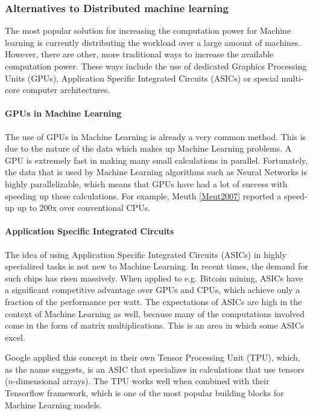 
\subsubsection{Alternatives to Distributed machine learning}
The most popular solution for increasing the computation power for Machine
learning is currently distributing the workload over a large amount of machines. However, there are other, more traditional ways to increase the available computation power. These ways include the use of dedicated Graphics Processing Units (GPUs), Application Specific Integrated Circuits (ASICs) or special multi-core computer architectures.

\paragraph{GPUs in Machine Learning}
The use of GPUs in Machine Learning is already a very common method. This is due to the nature of the data which makes up Machine Learning problems. A GPU is extremely fast in making many small calculations in parallel. Fortunately, the data that is used by Machine Learning algorithms such as Neural Networks is highly parallelizable, which means that GPUs have had a lot of success with speeding up these calculations. For example, Meuth \ref{Meut2007} reported a speed-up up to 200x over conventional CPUs.

\paragraph{Application Specific Integrated Circuits}
The idea of using Application Specific Integrated Circuits (ASICs) in highly specialized tasks is not new to Machine Learning. In recent times, the demand for such chips has risen massively\cite{Metz18}.
When applied to e.g. Bitcoin mining, ASICs have a significant competitive advantage over GPUs and CPUs, which achieve only a fraction of the performance per watt. The expectations of ASICs are high in the context of Machine Learning as well, because many of the computations involved come in the form of matrix multiplications. This is an area in which some ASICs excel.

Google applied this concept in their own Tensor Processing Unit (TPU)\cite{Sato17}, which, as the name suggests, is an ASIC that specializes in calculations that use tensors ($n$-dimensional arrays). The TPU works well when combined with their Tensorflow\cite{Tensorflow2015}\cite{Tensorflow2016} framework, which is one of the most popular building blocks for Machine Learning models.

